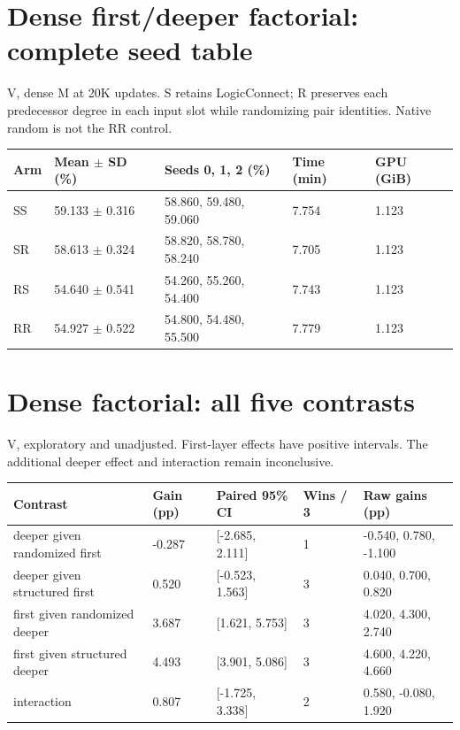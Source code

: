 \documentclass[10pt,a4paper]{article}
\begin{document}
\section*{Dense first/deeper factorial: complete seed table}
V, dense M at 20K updates. S retains LogicConnect; R preserves each predecessor degree in each input slot while randomizing pair identities. Native random is not the RR control.
\par\bigskip
\setlength{\tabcolsep}{2pt}
\begin{tabular}{@{}p{57mm}p{47.0mm}p{47.0mm}p{47.0mm}p{47.0mm}@{}}
\toprule
Arm & Mean $\pm$ SD (\%) & Seeds 0, 1, 2 (\%) & Time (min) & GPU (GiB) \\ \midrule
SS & 59.133 $\pm$ 0.316 & 58.860, 59.480, 59.060 & 7.754 & 1.123 \\
SR & 58.613 $\pm$ 0.324 & 58.820, 58.780, 58.240 & 7.705 & 1.123 \\
RS & 54.640 $\pm$ 0.541 & 54.260, 55.260, 54.400 & 7.743 & 1.123 \\
RR & 54.927 $\pm$ 0.522 & 54.800, 54.480, 55.500 & 7.779 & 1.123 \\
\bottomrule
\end{tabular}
\clearpage
\section*{Dense factorial: all five contrasts}
V, exploratory and unadjusted. First-layer effects have positive intervals. The additional deeper effect and interaction remain inconclusive.
\par\bigskip
\setlength{\tabcolsep}{2pt}
\begin{tabular}{@{}p{57mm}p{47.0mm}p{47.0mm}p{47.0mm}p{47.0mm}@{}}
\toprule
Contrast & Gain (pp) & Paired 95\% CI & Wins / 3 & Raw gains (pp) \\ \midrule
deeper given randomized first & -0.287 & [-2.685, 2.111] & 1 & -0.540, 0.780, -1.100 \\
deeper given structured first & 0.520 & [-0.523, 1.563] & 3 & 0.040, 0.700, 0.820 \\
first given randomized deeper & 3.687 & [1.621, 5.753] & 3 & 4.020, 4.300, 2.740 \\
first given structured deeper & 4.493 & [3.901, 5.086] & 3 & 4.600, 4.220, 4.660 \\
interaction & 0.807 & [-1.725, 3.338] & 2 & 0.580, -0.080, 1.920 \\
\bottomrule
\end{tabular}
\clearpage
\end{document}
